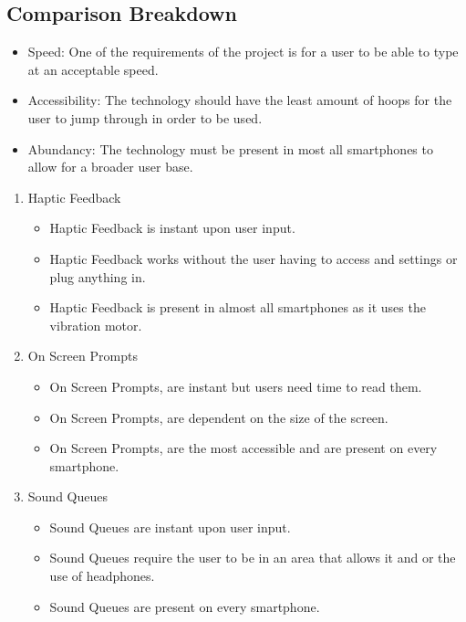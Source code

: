 \documentclass[onecolumn, draftclsnofoot,10pt, journal, letterpaper]{IEEEtran}
\begin{document}
    \subsection{Comparison Breakdown}
        \begin{itemize}
            \item Speed: One of the requirements of the project is for a user to be able to type at an acceptable speed. 
            \item Accessibility: The technology should have the least amount of hoops for the user to jump through in order to be used. 
            \item Abundancy: The technology must be present in most all smartphones to allow for a broader user base. 
        \end{itemize}
        
        \begin{enumerate}
            \item Haptic Feedback
            \begin{itemize}
                \item Haptic Feedback is instant upon user input.
                \item Haptic Feedback works without the user having to access and settings or plug anything in.
                \item Haptic Feedback is present in almost all smartphones as it uses the vibration motor. 
            \end{itemize}
            \item On Screen Prompts
            \begin{itemize}
                \item On Screen Prompts, are instant but users need time to read them.
                \item On Screen Prompts, are dependent on the size of the screen.
                \item On Screen Prompts, are the most accessible and are present on every smartphone.
            \end{itemize}
            \item Sound Queues
            \begin{itemize}
                \item Sound Queues are instant upon user input. 
                \item Sound Queues require the user to be in an area that allows it and or the use of headphones.
                \item Sound Queues are present on every smartphone.
            \end{itemize}
        \end{enumerate}
        
\end{document}
